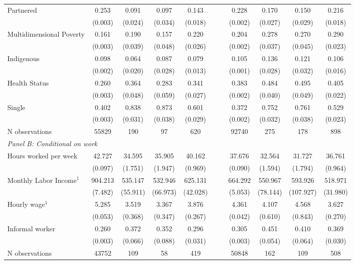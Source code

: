 \begin{table}[htbp]
{\begin{tabular}{lccccc|ccccc}
Partnered & 0.253 & 0.091 & 0.097 & 0.143 &  &  & 0.228 & 0.170 & 0.150 & 0.216 \\
 & (0.003) & (0.024) & (0.034) & (0.018) &  &  & (0.002) & (0.027) & (0.029) & (0.018) \\
Multidimensional Poverty & 0.161 & 0.190 & 0.157 & 0.220 &  &  & 0.204 & 0.278 & 0.270 & 0.290 \\
 & (0.003) & (0.039) & (0.048) & (0.026) &  &  & (0.002) & (0.037) & (0.045) & (0.023) \\
Indigenous & 0.098 & 0.064 & 0.087 & 0.079 &  &  & 0.105 & 0.136 & 0.121 & 0.106 \\
 & (0.002) & (0.020) & (0.028) & (0.013) &  &  & (0.001) & (0.028) & (0.032) & (0.016) \\
Health Status & 0.260 & 0.364 & 0.283 & 0.341 &  &  & 0.383 & 0.484 & 0.495 & 0.405 \\
 & (0.003) & (0.048) & (0.059) & (0.027) &  &  & (0.002) & (0.040) & (0.049) & (0.022) \\
Single & 0.402 & 0.838 & 0.873 & 0.601 &  &  & 0.372 & 0.752 & 0.761 & 0.529 \\
 & (0.003) & (0.031) & (0.038) & (0.029) &  &  & (0.002) & (0.032) & (0.038) & (0.023) \\\hline
N observations        & 55829 & 190 & 97 & 620 & \multicolumn{1}{l|}{} & \multicolumn{1}{l}{} & 92740 & 275 & 178 & 898 \\ \hline
\multicolumn{5}{l}{\textit{Panel B: Conditional on work}}                                                                                                                                 & \multicolumn{1}{l|}{} & \multicolumn{1}{l}{} & \multicolumn{1}{l}{} & \multicolumn{1}{l}{} & \multicolumn{1}{l}{} & \multicolumn{1}{l}{}                                      \\
Hours worked per week & 42.727 & 34.595 & 35.905 & 40.162 &  &  & 37.676 & 32.564 & 31.727 & 36.761 \\
 & (0.097) & (1.751) & (1.947) & (0.969) &  &  & (0.090) & (1.594) & (1.794) & (0.964) \\
Monthly Labor Income$^1$ & 904.213 & 535.147 & 532.946 & 625.131 &  &  & 664.292 & 550.967 & 593.926 & 518.971 \\
 & (7.482) & (55.911) & (66.973) & (42.028) &  &  & (5.053) & (78.144) & (107.927) & (31.980) \\
Hourly wage$^1$ & 5.285 & 3.519 & 3.367 & 3.876 &  &  & 4.361 & 4.107 & 4.568 & 3.627 \\
 & (0.053) & (0.368) & (0.347) & (0.267) &  &  & (0.042) & (0.610) & (0.843) & (0.270) \\
Informal worker & 0.260 & 0.372 & 0.352 & 0.296 &  &  & 0.305 & 0.451 & 0.410 & 0.369 \\
 & (0.003) & (0.066) & (0.088) & (0.031) &  &  & (0.003) & (0.054) & (0.064) & (0.030) \\\hline
N observations        & 43752 & 109 & 58 & 419 & \multicolumn{1}{l|}{} & \multicolumn{1}{l}{} & 50848 & 162 & 109 & 508 \\ \hline
\end{tabular}
}


\end{table}
